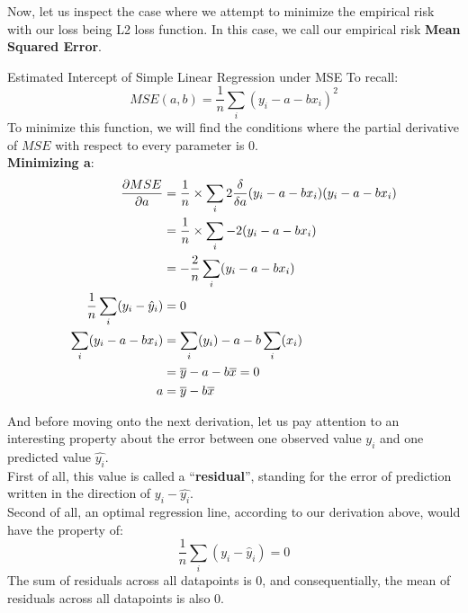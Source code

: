 Now, let us inspect the case where we attempt to minimize the empirical risk with our loss being L2 loss function. In this case, we call our empirical risk \textbf{Mean Squared Error}.
\begin{ln-derive}{Estimated Intercept of Simple Linear Regression under MSE}{}
    To recall:
    \[MSE(a, b) = \frac{1}{n} \sum_i {(y_i - a - b x_i)}^2\]
    To minimize this function, we will find the conditions where the partial derivative of $MSE$ with respect to every parameter is $0$. \\
    \textbf{Minimizing a}: \\
    \begin{align*}
        \pdv{MSE}{a} &= \frac{1}{n} \times \sum_i 2\frac{\delta}{\delta a}(y_i - a - b x_i)(y_i - a - b x_i) \\
        &= \frac{1}{n} \times \sum_i -2(y_i - a - b x_i) \\
        &= -\frac{2}{n} \sum_i (y_i - a - b x_i) \\
        \frac{1}{n} \sum_i (y_i - \hat{y}_i) &= 0 \\
        \sum_i (y_i - a - b x_i)
        &= \sum_i (y_i) - a - b\sum_i (x_i) \\
        &= \overline{y} - a - b \overline{x} = 0 \\
        a &= \overline{y} - b \overline{x}
    \end{align*}
\end{ln-derive}
And before moving onto the next derivation, let us pay attention to an interesting property about the error between one observed value $y_i$ and one predicted value $\hat{y_i}$. \\
First of all, this value is called a ``\textbf{residual}'', standing for the error of prediction written in the direction of $y_i - \hat{y_i}$. \\
Second of all, an optimal regression line, according to our derivation above, would have the property of:
\[\frac{1}{n} \sum_i (y_i - \hat{y}_i) = 0\]
The sum of residuals across all datapoints is $0$, and consequentially, the mean of residuals across all datapoints is also $0$.

